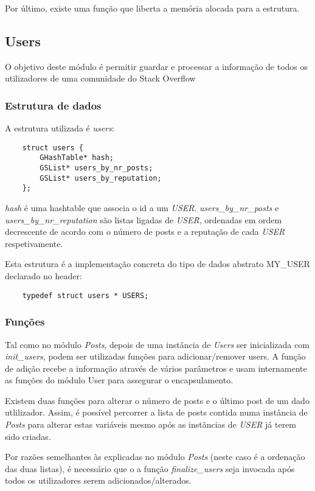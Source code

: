 \documentclass[10pt]{article}
\begin{document}
	Por último, existe uma função que liberta a memória alocada para a estrutura.

\subsection{Users}
	O objetivo deste módulo é permitir guardar e processar a informação de todos os utilizadores de uma comunidade do Stack Overflow
\subsubsection{Estrutura de dados}

	A estrutura utilizada é \emph{users}:
	\begin{lstlisting}
	struct users {
		GHashTable* hash;
		GSList* users_by_nr_posts;
		GSList* users_by_reputation;
	};
	\end{lstlisting}

	\emph{hash} é uma hashtable que associa o id a um \emph{USER}. \emph{users\_by\_nr\_posts} e \emph{users\_by\_nr\_reputation} são listas ligadas de \emph{USER}, ordenadas em ordem decrescente de acordo com o número de posts e a reputação de cada \emph{USER} respetivamente.

	Esta estrutura é a implementação concreta do tipo de dados abstrato MY\_USER declarado no header:
	\begin{lstlisting} 
	typedef struct users * USERS;
	\end{lstlisting}

\subsubsection{Funções}
	Tal como no módulo \emph{Posts}, depois de uma instância de \emph{Users} ser inicializada com \emph{init\_users}, podem ser utilizadas funções para adicionar/remover users. A função de adição recebe a informação através de vários parâmetros e usam internamente as funções do módulo User para assegurar o encapsulamento.

	Existem duas funções para alterar o número de posts e o último post de um dado utlilizador. Assim, é possível percorrer a lista de posts contida numa instância de \emph{Posts} para alterar estas variáveis mesmo após as instâncias de \emph{USER} já terem sido criadas.

	Por razões semelhantes às explicadas no módulo \emph{Posts} (neste caso é a ordenação das duas listas), é necessário que o a função \emph{finalize\_users} seja invocada após todos os utilizadores serem adicionados/alterados.
\end{document}
